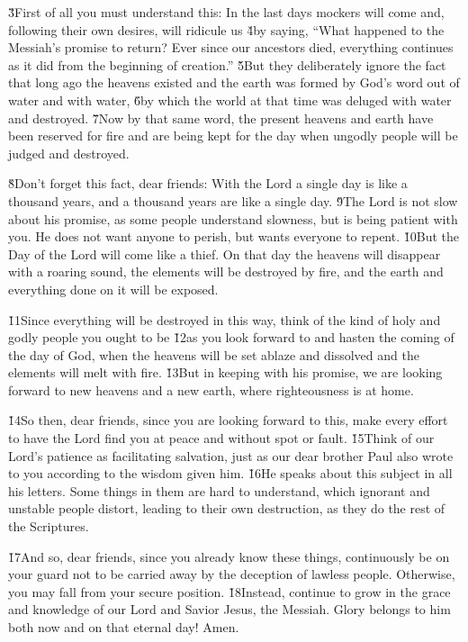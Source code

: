 \v{3}First of all you must understand this: In the last days mockers will come and, following their own desires, will ridicule us \v{4}by saying, ``What happened to the Messiah's promise to return? Ever since our ancestors died, everything continues as it did from the beginning of creation.'' \v{5}But they deliberately ignore the fact that long ago the heavens existed and the earth was formed by God's word out of water and with water, \v{6}by which the world at that time was deluged with water and destroyed. \v{7}Now by that same word, the present heavens and earth have been reserved for fire and are being kept for the day when ungodly people will be judged and destroyed.

\v{8}Don't forget this fact, dear friends: With the Lord a single day is like a thousand years, and a thousand years are like a single day. \v{9}The Lord is not slow about his promise, as some people understand slowness, but is being patient with you. He does not want anyone to perish, but wants everyone to repent. \v{10}But the Day of the Lord will come like a thief. On that day the heavens will disappear with a roaring sound, the elements will be destroyed by fire, and the earth and everything done on it will be exposed.

\v{11}Since everything will be destroyed in this way, think of the kind of holy and godly people you ought to be \v{12}as you look forward to and hasten the coming of the day of God, when the heavens will be set ablaze and dissolved and the elements will melt with fire. \v{13}But in keeping with his promise, we are looking forward to new heavens and a new earth, where righteousness is at home.

\v{14}So then, dear friends, since you are looking forward to this, make every effort to have the Lord find you at peace and without spot or fault. \v{15}Think of our Lord's patience as facilitating salvation, just as our dear brother Paul also wrote to you according to the wisdom given him. \v{16}He speaks about this subject in all his letters. Some things in them are hard to understand, which ignorant and unstable people distort, leading to their own destruction, as they do the rest of the Scriptures.

\v{17}And so, dear friends, since you already know these things, continuously be on your guard not to be carried away by the deception of lawless people. Otherwise, you may fall from your secure position. \v{18}Instead, continue to grow in the grace and knowledge of our Lord and Savior Jesus, the Messiah. Glory belongs to him both now and on that eternal day! Amen.
